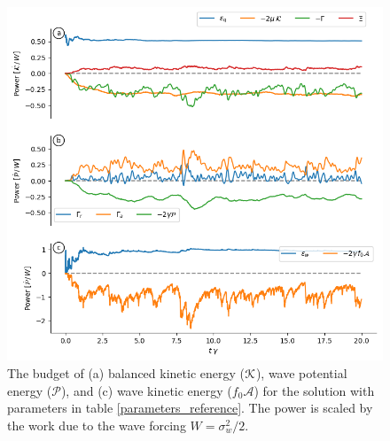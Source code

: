\documentclass[12pt]{article}
\renewcommand{\P}{\mathcal{P}}
\newcommand{\A}{  \mathcal{A}}
\begin{document}
\begin{figure}
\centering
\includegraphics[width=.825\textwidth]{figs/K_and_P_and_A_budget_reference.png}
\caption{The budget of (a) balanced kinetic energy ($\mathcal{K}$), wave potential energy ($\P$),
        and (c) wave
         kinetic energy ($f_0 \A$)  for the solution with parameters in table
         \ref{parameters_reference}. The power is scaled by the work due to the
         wave forcing $W=\sigma_w^2/2$.}
        \label{energy_budgets_reference}
\end{figure}
\end{document}
